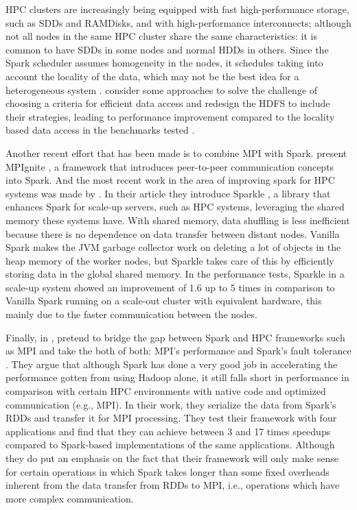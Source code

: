 \documentclass{article}
\begin{document}
HPC clusters are increasingly being equipped with fast high-performance storage, such as SDDs and RAMDisks, and with high-performance interconnects; although not all nodes in the same HPC cluster share the same characteristics: it is common to have SDDs in some nodes and normal HDDs in others. Since the Spark scheduler assumes homogeneity in the nodes, it schedules taking into account the locality of the data, which may not be the best idea for a heterogeneous system \cite{Islam2016}. \citeauthor{Islam2016} consider some approaches to solve the challenge of choosing a criteria for efficient data access and redesign the HDFS to include their strategies, leading to performance improvement compared to the locality based data access in the benchmarks tested \cite{Islam2016}.

Another recent effort that has been made is to combine MPI with Spark. \citeauthor{Morris2017} present MPIgnite \cite{Morris2017}, a framework that introduces peer-to-peer communication concepts into Spark. And the most recent work in the area of improving spark for HPC systems was made by \citeauthor{kim2017sparkle}. In their article they introduce Sparkle \cite{kim2017sparkle}, a library that enhances Spark for scale-up servers, such as HPC systems, leveraging the shared memory these systems have. With shared memory, data shuffling is less inefficient because there is no dependence on data transfer between distant nodes. Vanilla Spark makes the JVM garbage collector work on deleting a lot of objects in the heap memory of the worker nodes, but Sparkle takes care of this by efficiently storing data in the global shared memory. In the performance tests, Sparkle in a scale-up system showed an improvement of 1.6 up to 5 times in comparison to Vanilla Spark running on a scale-out cluster with equivalent hardware, this mainly due to the faster communication between the nodes.

Finally, in \citeyear{Anderson2017}, \citeauthor{Anderson2017} pretend to bridge the gap between Spark and HPC frameworks such as MPI and take the both of both: MPI's performance and Spark's fault tolerance \cite{Anderson2017}. They argue that although Spark has done a very good job in accelerating the performance gotten from using Hadoop alone, it still falls short in performance in comparison with certain HPC environments with native code and optimized communication (e.g., MPI). In their work, they serialize the data from Spark's RDDs and transfer it for MPI processing. They test their framework with four applications and find that they can achieve between 3 and 17 times speedups compared to Spark-based implementations of the same applications. Although they do put an emphasis on the fact that their framework will only make sense for certain operations in which Spark takes longer than some fixed overheads inherent from the data transfer from RDDs to MPI, i.e., operations which have more complex communication.
\end{document}
